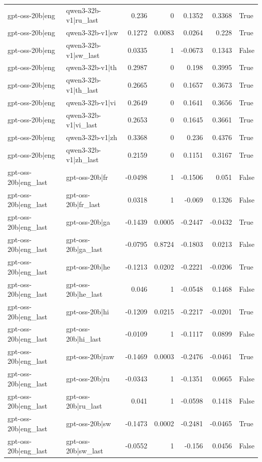 \begin{table}
\begin{tabular}{l l r r r r l}
gpt-oss-20b|eng & qwen3-32b-v1|ru_last & 0.236 & 0 & 0.1352 & 0.3368 & True \\
gpt-oss-20b|eng & qwen3-32b-v1|sw & 0.1272 & 0.0083 & 0.0264 & 0.228 & True \\
gpt-oss-20b|eng & qwen3-32b-v1|sw_last & 0.0335 & 1 & -0.0673 & 0.1343 & False \\
gpt-oss-20b|eng & qwen3-32b-v1|th & 0.2987 & 0 & 0.198 & 0.3995 & True \\
gpt-oss-20b|eng & qwen3-32b-v1|th_last & 0.2665 & 0 & 0.1657 & 0.3673 & True \\
gpt-oss-20b|eng & qwen3-32b-v1|vi & 0.2649 & 0 & 0.1641 & 0.3656 & True \\
gpt-oss-20b|eng & qwen3-32b-v1|vi_last & 0.2653 & 0 & 0.1645 & 0.3661 & True \\
gpt-oss-20b|eng & qwen3-32b-v1|zh & 0.3368 & 0 & 0.236 & 0.4376 & True \\
gpt-oss-20b|eng & qwen3-32b-v1|zh_last & 0.2159 & 0 & 0.1151 & 0.3167 & True \\
gpt-oss-20b|eng_last & gpt-oss-20b|fr & -0.0498 & 1 & -0.1506 & 0.051 & False \\
gpt-oss-20b|eng_last & gpt-oss-20b|fr_last & 0.0318 & 1 & -0.069 & 0.1326 & False \\
gpt-oss-20b|eng_last & gpt-oss-20b|ga & -0.1439 & 0.0005 & -0.2447 & -0.0432 & True \\
gpt-oss-20b|eng_last & gpt-oss-20b|ga_last & -0.0795 & 0.8724 & -0.1803 & 0.0213 & False \\
gpt-oss-20b|eng_last & gpt-oss-20b|he & -0.1213 & 0.0202 & -0.2221 & -0.0206 & True \\
gpt-oss-20b|eng_last & gpt-oss-20b|he_last & 0.046 & 1 & -0.0548 & 0.1468 & False \\
gpt-oss-20b|eng_last & gpt-oss-20b|hi & -0.1209 & 0.0215 & -0.2217 & -0.0201 & True \\
gpt-oss-20b|eng_last & gpt-oss-20b|hi_last & -0.0109 & 1 & -0.1117 & 0.0899 & False \\
gpt-oss-20b|eng_last & gpt-oss-20b|raw & -0.1469 & 0.0003 & -0.2476 & -0.0461 & True \\
gpt-oss-20b|eng_last & gpt-oss-20b|ru & -0.0343 & 1 & -0.1351 & 0.0665 & False \\
gpt-oss-20b|eng_last & gpt-oss-20b|ru_last & 0.041 & 1 & -0.0598 & 0.1418 & False \\
gpt-oss-20b|eng_last & gpt-oss-20b|sw & -0.1473 & 0.0002 & -0.2481 & -0.0465 & True \\
gpt-oss-20b|eng_last & gpt-oss-20b|sw_last & -0.0552 & 1 & -0.156 & 0.0456 & False \\

\end{tabular}
\end{table}
